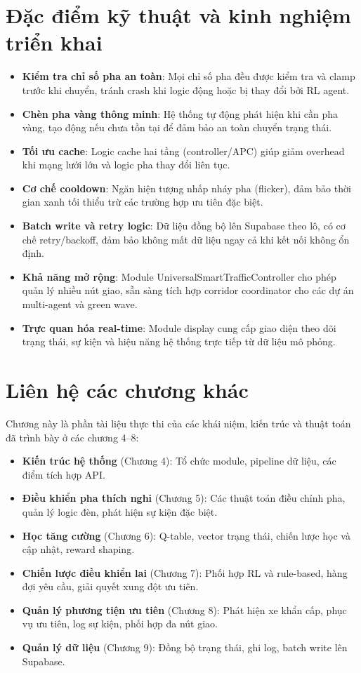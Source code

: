 \section{Đặc điểm kỹ thuật và kinh nghiệm triển khai}

\begin{itemize}
    \item \textbf{Kiểm tra chỉ số pha an toàn}: Mọi chỉ số pha đều được kiểm tra và clamp trước khi chuyển, tránh crash khi logic động hoặc bị thay đổi bởi RL agent.
    \item \textbf{Chèn pha vàng thông minh}: Hệ thống tự động phát hiện khi cần pha vàng, tạo động nếu chưa tồn tại để đảm bảo an toàn chuyển trạng thái.
    \item \textbf{Tối ưu cache}: Logic cache hai tầng (controller/APC) giúp giảm overhead khi mạng lưới lớn và logic pha thay đổi liên tục.
    \item \textbf{Cơ chế cooldown}: Ngăn hiện tượng nhấp nháy pha (flicker), đảm bảo thời gian xanh tối thiểu trừ các trường hợp ưu tiên đặc biệt.
    \item \textbf{Batch write và retry logic}: Dữ liệu đồng bộ lên Supabase theo lô, có cơ chế retry/backoff, đảm bảo không mất dữ liệu ngay cả khi kết nối không ổn định.
    \item \textbf{Khả năng mở rộng}: Module UniversalSmartTrafficController cho phép quản lý nhiều nút giao, sẵn sàng tích hợp corridor coordinator cho các dự án multi-agent và green wave.
    \item \textbf{Trực quan hóa real-time}: Module display cung cấp giao diện theo dõi trạng thái, sự kiện và hiệu năng hệ thống trực tiếp từ dữ liệu mô phỏng.
\end{itemize}

\section{Liên hệ các chương khác}

Chương này là phần tài liệu thực thi của các khái niệm, kiến trúc và thuật toán đã trình bày ở các chương 4--8:
\begin{itemize}
    \item \textbf{Kiến trúc hệ thống} (Chương 4): Tổ chức module, pipeline dữ liệu, các điểm tích hợp API.
    \item \textbf{Điều khiển pha thích nghi} (Chương 5): Các thuật toán điều chỉnh pha, quản lý logic đèn, phát hiện sự kiện đặc biệt.
    \item \textbf{Học tăng cường} (Chương 6): Q-table, vector trạng thái, chiến lược học và cập nhật, reward shaping.
    \item \textbf{Chiến lược điều khiển lai} (Chương 7): Phối hợp RL và rule-based, hàng đợi yêu cầu, giải quyết xung đột ưu tiên.
    \item \textbf{Quản lý phương tiện ưu tiên} (Chương 8): Phát hiện xe khẩn cấp, phục vụ ưu tiên, log sự kiện, phối hợp đa nút giao.
    \item \textbf{Quản lý dữ liệu} (Chương 9): Đồng bộ trạng thái, ghi log, batch write lên Supabase.
\end{itemize}

